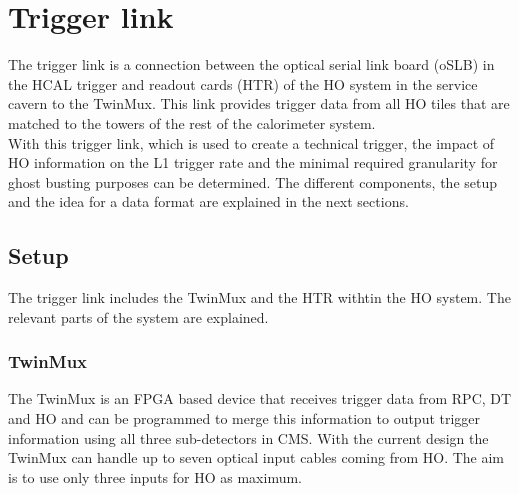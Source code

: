 \section{Trigger link}
The trigger link is a connection between the optical serial link board (oSLB) in the HCAL trigger and readout cards (HTR) of the HO system in the service cavern to the TwinMux. This link provides trigger data from all HO tiles that are matched to the towers of the rest of the calorimeter system.\\
With this trigger link, which is used to create a technical trigger, the impact of HO information on the L1 trigger rate and the minimal required granularity for ghost busting purposes can be determined.
The different components, the setup and the idea for a data format are explained in the next sections.
\subsection{Setup}
The trigger link includes the TwinMux and the HTR withtin the HO system. The relevant parts of the system are explained.
\subsubsection{TwinMux}
The TwinMux is an FPGA based device that receives trigger data from RPC, DT and HO and can be programmed to merge this information to output trigger information using all three sub-detectors in CMS. With the current design the TwinMux can handle up to seven optical input cables coming from HO. The aim is to use only three inputs for HO as maximum.
